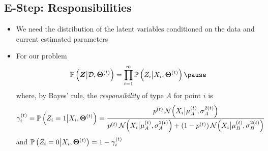\begin{slide}
\section[-1]{E-Step: Responsibilities}

\begin{PauseHighLight}
  \begin{itemize}
  \item We need the distribution of the latent variables
    conditioned on the data and current estimated parameters\pause
  \item For our problem
    \begin{align*}
      \Prob{\bm{Z}\big|\data,\bm{\Theta}^{(t)}} =
      \prod_{i=1}^m \Prob{Z_i\big|X_i,\bm{\Theta}^{(t)}}\pause
    \end{align*}
    where, by Bayes' rule, the \emph{responsibility} of type $A$ for
    point $i$ is {\small
    \begin{align*}
      \gamma_i^{(t)} = \mathbb{P}\left( Z_i=1\big|X_i,\bm{\Theta}^{(t)} \right) &= \frac{p^{(t)}\,
      \mathcal{N}\!\left( X_i\big|\mu_A^{(t)},\sigma_A^{2(t)} \right) }
     { p^{(t)}\,\mathcal{N}\!\left( X_i\big|\mu_A^{(t)},\sigma_A^{2(t)} \right) +
     (1-p^{(t)})\, \mathcal{N}\!\left( X_i\big|\mu_B^{(t)},\sigma_B^{2(t)} \right) }
    \end{align*}}
    and $\mathbb{P}\left( Z_i=0\big|X_i,\bm{\Theta}^{(t)} \right) = 1 - \gamma_i^{(t)}$\pause
  \end{itemize}
\end{PauseHighLight}


\end{slide}


